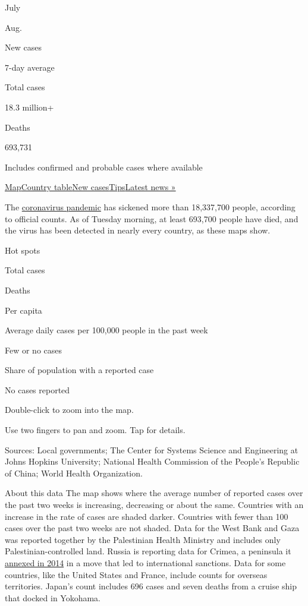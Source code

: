 July

Aug.

New cases

7-day average

Total cases

18.3 million+

Deaths

693,731

Includes confirmed and probable cases where available

\protect\hyperlink{map}{Map}\protect\hyperlink{countries}{Country
table}\protect\hyperlink{cases}{New
cases}\protect\hyperlink{tips}{Tips}\href{https://www.nytimes.com/2020/08/03/world/coronavirus-covid-19.html}{Latest
news »}

The
\href{https://www.nytimes.com/article/prepare-for-coronavirus.html}{coronavirus
pandemic} has sickened more than 18,337,700 people, according to
official counts. As of Tuesday morning, at least 693,700 people have
died, and the virus has been detected in nearly every country, as these
maps show.

Hot spots

Total cases

Deaths

Per capita

Average daily cases per 100,000 people in the past week

Few or no cases

Share of population with a reported case

No cases reported

Double-click to zoom into the map.

Use two fingers to pan and zoom. Tap for details.

Sources: Local governments; The Center for Systems Science and
Engineering at Johns Hopkins University; National Health Commission of
the People's Republic of China; World Health Organization.

About this data The map shows where the average number of reported cases
over the past two weeks is increasing, decreasing or about the same.
Countries with an increase in the rate of cases are shaded darker.
Countries with fewer than 100 cases over the past two weeks are not
shaded. Data for the West Bank and Gaza was reported together by the
Palestinian Health Ministry and includes only Palestinian-controlled
land. Russia is reporting data for Crimea, a peninsula it
\href{https://www.nytimes.com/2014/03/19/world/europe/ukraine.html}{annexed
in 2014} in a move that led to international sanctions. Data for some
countries, like the United States and France, include counts for
overseas territories. Japan's count includes 696 cases and seven deaths
from a cruise ship that docked in Yokohama.

